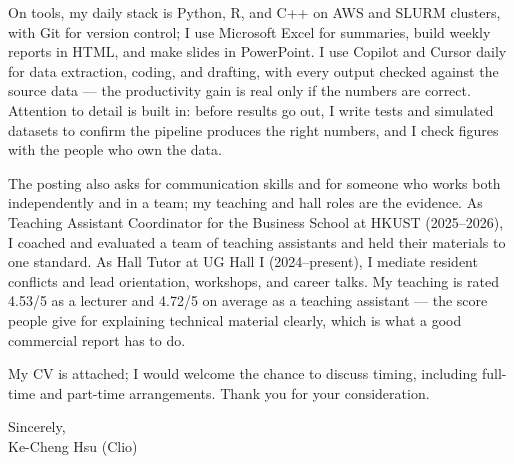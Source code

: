 \documentclass[11pt,letterpaper]{article}
\begin{document}
On tools, my daily stack is Python, R, and C++ on AWS and SLURM clusters, with Git for version control; I use Microsoft Excel for summaries, build weekly reports in HTML, and make slides in PowerPoint. I use Copilot and Cursor daily for data extraction, coding, and drafting, with every output checked against the source data --- the productivity gain is real only if the numbers are correct. Attention to detail is built in: before results go out, I write tests and simulated datasets to confirm the pipeline produces the right numbers, and I check figures with the people who own the data.

The posting also asks for communication skills and for someone who works both independently and in a team; my teaching and hall roles are the evidence. As Teaching Assistant Coordinator for the Business School at HKUST (2025--2026), I coached and evaluated a team of teaching assistants and held their materials to one standard. As Hall Tutor at UG Hall I (2024--present), I mediate resident conflicts and lead orientation, workshops, and career talks. My teaching is rated 4.53/5 as a lecturer and 4.72/5 on average as a teaching assistant --- the score people give for explaining technical material clearly, which is what a good commercial report has to do.

My CV is attached; I would welcome the chance to discuss timing, including full-time and part-time arrangements. Thank you for your consideration.

\vspace{0.2em}
Sincerely,\\[0.2em]
Ke-Cheng Hsu (Clio)
\end{document}
